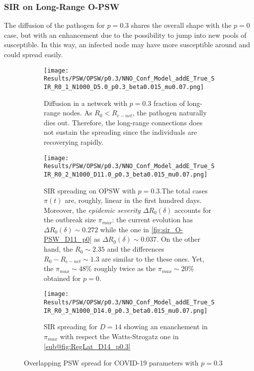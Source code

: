 \documentclass[a4paper,10pt,twoside]{book} %
\theoremstyle{definition}
\begin{document}
\clearpage
\subsubsection*{SIR on Long-Range O-PSW}
The diffusion of the pathogen for $p = 0.3$ shares the overall shape with the $p = 0$ case, but with an enhancement due to the possibility to jump into new pools of susceptible. In this way, an infected node may have more susceptible around and could spread easily.

\begin{figure}[htbp]
	\centering
	\begin{subfigure}[t]{\linewidth}
		\centering
		\texttt{[image: Results/PSW/OPSW/p0.3/NNO\_Conf\_Model\_addE\_True\_SIR\_R0\_1\_N1000\_D5.0\_p0.3\_beta0.015\_mu0.07.png]}
		\caption{Diffusion in a network with $p = 0.3$ fraction of long-range nodes. As $R_0 < R_{c-net}$, the pathogen naturally dies out. Therefore, the long-range connections does not sustain the spreading since the individuals are recoverying rapidly.}
		\label{fig:sir_O-PSW_D5_p0.3}
	\end{subfigure}
	\begin{subfigure}[t]{\linewidth}
		\centering
		\texttt{[image: Results/PSW/OPSW/p0.3/NNO\_Conf\_Model\_addE\_True\_SIR\_R0\_2\_N1000\_D11.0\_p0.3\_beta0.015\_mu0.07.png]}
		\caption{SIR spreading on OPSW with $ p = 0.3$.The total cases $ \pi(t)$ are, roughly, linear in the first hundred days. Moreover, the \textit{epidemic severity} $ \Delta R_0(\delta)$  accounts for the outbreak size $ \pi_{max}$: the current evolution has $\Delta R_0(\delta) \sim 0.272$ while the one in \autoref{fig:sir_O-PSW_D11_p0} as $ \Delta R_0(\delta) \sim 0.037$. On the other hand, the $R_0 \sim 2.35$ and the differences  $R_0 - R_{c-net} \sim 1.3$ are similar to the these ones. Yet, the $\pi_{max} \sim 48\%$ roughly twice as the $\pi_{max} \sim 20\%$ obtained for $ p = 0$.}
		\label{fig:sir_O-PSW_D11_p0.3}
	\end{subfigure}
	\begin{subfigure}[t]{\linewidth}
		\centering
		\texttt{[image: Results/PSW/OPSW/p0.3/NNO\_Conf\_Model\_addE\_True\_SIR\_R0\_3\_N1000\_D14.0\_p0.3\_beta0.015\_mu0.07.png]}
		\caption{SIR spreading for $ D = 14$ showing an enanchement in $ \pi_{max} $ with respect the Watts-Strogatz one in \autoref{sub@fig:RegLat_D14_p0.3} }
		\label{fig:sir_O-PSW_D14_p0.3}
	\end{subfigure}
	\caption{Overlapping PSW spread for COVID-19 parameters with $p = 0.3$ }
\end{figure}
\end{document}
